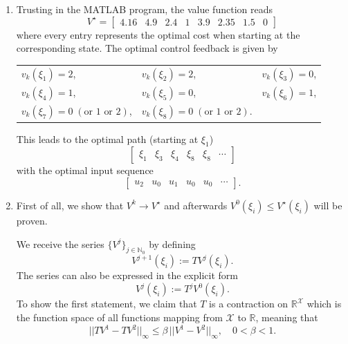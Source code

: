 \documentclass[12pt,pdftex,a4paper]{scrartcl}
\newcommand{\set}[1]{\mathbb{#1}}
\begin{document}
\begin{enumerate}
	\item Trusting in the MATLAB program, the value function reads
	\begin{equation*}
		V^\star =
		\begin{bmatrix}
			4.16 & 4.9 & 2.4 & 1 & 3.9 & 2.35 & 1.5 & 0 
		\end{bmatrix}
	\end{equation*}
	where every entry represents the optimal cost when starting at the corresponding state.	
	The optimal control feedback is given by
	\begin{center}
	\begin{tabular}{ l l l }
    $v_k(\xi_1) = 2$, & $v_k(\xi_2) = 2$, & $v_k(\xi_3) = 0$, \\
	$v_k(\xi_4) = 1$, & $v_k(\xi_5) = 0$, & $v_k(\xi_6) = 1$, \\
	$v_k(\xi_7) = 0 \; (\text{or } 1 \text{ or } 2)$, & $v_k(\xi_8) = 0 \; (\text{or } 1 \text{ or } 2)$. & \\
    \end{tabular}
	\end{center}
	This leads to the optimal path (starting at $\xi_1$)
	\begin{equation*}
		\begin{bmatrix}
			\xi_1 & \xi_3 & \xi_4 & \xi_8 & \xi_8 & \cdots
		\end{bmatrix}
	\end{equation*}
	with the optimal input sequence
	\begin{equation*}
		\begin{bmatrix}
			u_2 & u_0 & u_1 & u_0 & u_0 & \cdots
		\end{bmatrix}.
	\end{equation*}	
	
	\item First of all, we show that $V^k \rightarrow V^\star$ and afterwards $V^0(\xi_i) \le V^\star(\xi_i)$ will be proven.
	
	We receive the series $\{V^j\}_{j\in \set{N}_0}$ by defining 
	\begin{equation*}
		V^{j+1}(\xi_i) := TV^j(\xi_i).
	\end{equation*}
	The series can also be expressed in the explicit form
	\begin{equation*}
		V^j(\xi_i) := T^jV^0(\xi_i).
	\end{equation*}
	To show the first statement, we claim that $T$ is a contraction on $\set{R}^\mathcal{X}$ which is the function space of all functions mapping from $\mathcal{X}$ to $\set{R}$, meaning that
	\begin{equation*}
		||TV^1 - TV^2||_\infty \le \beta\,||V^1 - V^2||_\infty, \quad 0 < \beta < 1.
	\end{equation*}
	

\end{enumerate}
\end{document}
